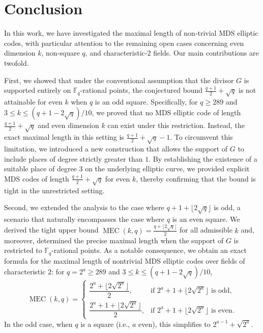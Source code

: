 \documentclass[journal,12pt,onecolumn]{IEEEtran}
\begin{document}
\section{Conclusion}\label{sec:conclusion}
In this work, we have investigated the maximal length of non‑trivial MDS elliptic codes, with particular attention to the remaining open cases concerning even dimension $k$, non‑square $q$, and characteristic‑$2$ fields. Our main contributions are twofold.

First, we showed that under the conventional assumption that the divisor $G$ is supported entirely on $\mathbb{F}_q$-rational points, the conjectured bound $\frac{q+1}{2}+\sqrt{q}$ is not attainable for even $k$ when $q$ is an odd square. Specifically, for $q \ge 289$ and $3 \le k \le (q+1-2\sqrt{q})/10$, we proved that no MDS elliptic code of length $\frac{q+1}{2}+\sqrt{q}$ and even dimension $k$ can exist under this restriction. Instead, the exact maximal length in this setting is $\frac{q+1}{2}+\sqrt{q}-1$. To circumvent this limitation, we introduced a new construction that allows the support of $G$ to include places of degree strictly greater than $1$. By establishing the existence of a suitable place of degree $3$ on the underlying elliptic curve, we provided explicit MDS codes of length $\frac{q+1}{2}+\sqrt{q}$ for even $k$, thereby confirming that the bound is tight in the unrestricted setting.

Second, we extended the analysis to the case where $q+1+\lfloor 2\sqrt{q}\rfloor$ is odd, a scenario that naturally encompasses the case where $q$ is an even square. We derived the tight upper bound $\operatorname{MEC}(k,q) = \frac{q+\lfloor 2\sqrt{q}\rfloor}{2}$ for all admissible $k$ and, moreover, determined the precise maximal length when the support of $G$ is restricted to $\mathbb{F}_q$-rational points. As a notable consequence, we obtain an exact formula for the maximal length of nontrivial MDS elliptic codes over fields of characteristic $2$: for $q = 2^a \ge 289$ and $3 \le k \le (q+1-2\sqrt{q})/10$,
\[
\operatorname{MEC}(k,q) = 
\begin{cases}
\dfrac{2^a + \lfloor 2\sqrt{2^a}\rfloor}{2}, & \text{if } 2^a+1+\lfloor 2\sqrt{2^a}\rfloor \text{ is odd},\\[8pt]
\dfrac{2^a + 1 + \lfloor 2\sqrt{2^a}\rfloor}{2}, & \text{if } 2^a+1+\lfloor 2\sqrt{2^a}\rfloor \text{ is even}.
\end{cases}
\]
In the odd case, when $q$ is a square (i.e., $a$ even), this simplifies to $2^{a-1} + \sqrt{2^a}$.
\end{document}
